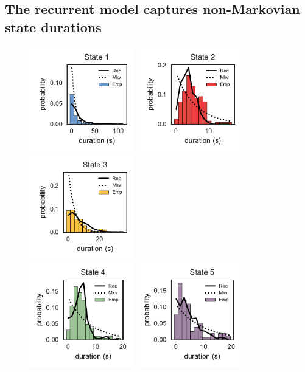 \documentclass{article}
\begin{document}
\clearpage

\subsection{The recurrent model captures non-Markovian state durations}

\begin{figure}[h]
\centering%
\includegraphics[width=1.8in]{figures/arhmm/durations_0.pdf}
\includegraphics[width=1.8in]{figures/arhmm/durations_1.pdf}
\includegraphics[width=1.8in]{figures/arhmm/durations_2.pdf}
\\
\includegraphics[width=1.8in]{figures/arhmm/durations_3.pdf}
\includegraphics[width=1.8in]{figures/arhmm/durations_4.pdf}

\end{figure}
\end{document}
